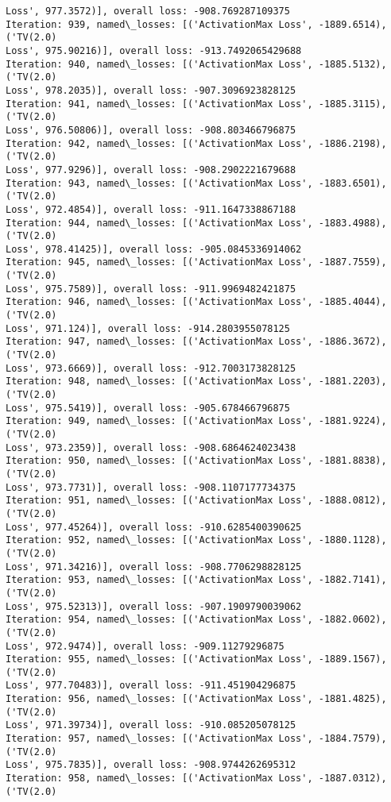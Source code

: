 \documentclass[10pt]{article}
\begin{document}
\begin{Verbatim}[commandchars=\\\{\}]
Loss', 977.3572)], overall loss: -908.769287109375
Iteration: 939, named\_losses: [('ActivationMax Loss', -1889.6514), ('TV(2.0)
Loss', 975.90216)], overall loss: -913.7492065429688
Iteration: 940, named\_losses: [('ActivationMax Loss', -1885.5132), ('TV(2.0)
Loss', 978.2035)], overall loss: -907.3096923828125
Iteration: 941, named\_losses: [('ActivationMax Loss', -1885.3115), ('TV(2.0)
Loss', 976.50806)], overall loss: -908.803466796875
Iteration: 942, named\_losses: [('ActivationMax Loss', -1886.2198), ('TV(2.0)
Loss', 977.9296)], overall loss: -908.2902221679688
Iteration: 943, named\_losses: [('ActivationMax Loss', -1883.6501), ('TV(2.0)
Loss', 972.4854)], overall loss: -911.1647338867188
Iteration: 944, named\_losses: [('ActivationMax Loss', -1883.4988), ('TV(2.0)
Loss', 978.41425)], overall loss: -905.0845336914062
Iteration: 945, named\_losses: [('ActivationMax Loss', -1887.7559), ('TV(2.0)
Loss', 975.7589)], overall loss: -911.9969482421875
Iteration: 946, named\_losses: [('ActivationMax Loss', -1885.4044), ('TV(2.0)
Loss', 971.124)], overall loss: -914.2803955078125
Iteration: 947, named\_losses: [('ActivationMax Loss', -1886.3672), ('TV(2.0)
Loss', 973.6669)], overall loss: -912.7003173828125
Iteration: 948, named\_losses: [('ActivationMax Loss', -1881.2203), ('TV(2.0)
Loss', 975.5419)], overall loss: -905.678466796875
Iteration: 949, named\_losses: [('ActivationMax Loss', -1881.9224), ('TV(2.0)
Loss', 973.2359)], overall loss: -908.6864624023438
Iteration: 950, named\_losses: [('ActivationMax Loss', -1881.8838), ('TV(2.0)
Loss', 973.7731)], overall loss: -908.1107177734375
Iteration: 951, named\_losses: [('ActivationMax Loss', -1888.0812), ('TV(2.0)
Loss', 977.45264)], overall loss: -910.6285400390625
Iteration: 952, named\_losses: [('ActivationMax Loss', -1880.1128), ('TV(2.0)
Loss', 971.34216)], overall loss: -908.7706298828125
Iteration: 953, named\_losses: [('ActivationMax Loss', -1882.7141), ('TV(2.0)
Loss', 975.52313)], overall loss: -907.1909790039062
Iteration: 954, named\_losses: [('ActivationMax Loss', -1882.0602), ('TV(2.0)
Loss', 972.9474)], overall loss: -909.11279296875
Iteration: 955, named\_losses: [('ActivationMax Loss', -1889.1567), ('TV(2.0)
Loss', 977.70483)], overall loss: -911.451904296875
Iteration: 956, named\_losses: [('ActivationMax Loss', -1881.4825), ('TV(2.0)
Loss', 971.39734)], overall loss: -910.085205078125
Iteration: 957, named\_losses: [('ActivationMax Loss', -1884.7579), ('TV(2.0)
Loss', 975.7835)], overall loss: -908.9744262695312
Iteration: 958, named\_losses: [('ActivationMax Loss', -1887.0312), ('TV(2.0)

\end{Verbatim}
\end{document}
